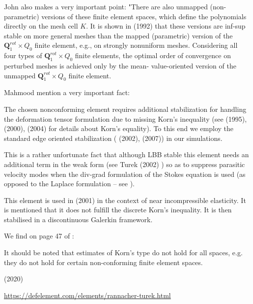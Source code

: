 \begin{remark} 
John also makes a very important point: "There are also unmapped 
(non-parametric) versions of 
these finite element spaces, which define the polynomials directly on 
the mesh cell $K$. It is shown in \textcite{ratu92} (1992) that these 
versions are inf-sup stable on more general meshes than
the mapped (parametric) version of the ${\bm Q}_1^{rot}\times Q_0$ 
finite element, e.g., on strongly
nonuniform meshes. Considering all four types of ${\bm Q}_1^{rot}\times Q_0$ 
finite elements, the
optimal order of convergence on perturbed meshes is achieved only by the mean-
value-oriented version of the unmapped ${\bm Q}_1^{rot}\times Q_0$   finite element.
\end{remark}

Mahmood \etal \cite{maky17} mention a very important fact: 
\begin{displayquote}
{\color{darkgray}
The chosen nonconforming element requires
additional stabilization for handling the deformation tensor 
formulation due to missing Korn's inequality 
(see \textcite{horg95} (1995), \textcite{knob00} (2000), \textcite{bren04} (2004) 
for details about Korn's equality). To this end we employ the standard 
edge oriented stabilization 
(\textcite{tuos02} (2002), \textcite{tuou07} (2007)) in our simulations.}
\end{displayquote}
This is a rather unfortunate fact that although LBB stable this 
element needs an additional 
term in the weak form (see Turek \etal (2002) \cite{tuos02}) 
so as to suppress parasitic velocity modes when the div-grad formulation 
of the Stokes equation is used (as opposed to the Laplace formulation -- see \cite[Section 6.5.2]{dohu03}).

This element is used in \textcite{hala01} (2001) in the context 
of near incompressible elasticity. 
It is mentioned that it does not fulfill the discrete Korn's inequality. 
It is then stabilised 
in a discontinuous Galerkin framework.

We find on page 47 of \textcite{john16}:
\begin{displayquote}
{\color{darkgray}
It should be noted that estimates of Korn's type do not hold for all spaces, e.g. they do not hold
for certain non-conforming finite element spaces.}
\end{displayquote}


\Literature \textcite{shee20} (2020)

\url{https://defelement.com/elements/rannacher-turek.html}





